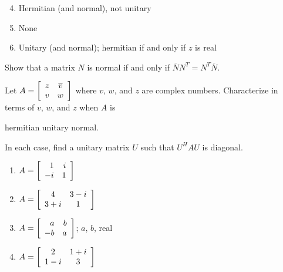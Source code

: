 \begin{multicols}{2}
\begin{ex}
\begin{sol}
\begin{enumerate}[label={\alph*.}]
\setcounter{enumi}{3}
\item  Hermitian (and normal), not unitary

\setcounter{enumi}{5}
\item  None

\setcounter{enumi}{7}
\item  Unitary (and normal); hermitian if and only if $z$ is real

\end{enumerate}
\end{sol}
\end{ex}

\begin{ex}
Show that a matrix $N$ is normal if and only if $\overline{N}N^T = N^T\overline{N}$.
\end{ex}

\begin{ex}
Let $A = \left[ \begin{array}{cc}
z & \overline{v} \\
v & w
\end{array}\right]$
 where $v$, $w$, and $z$ are complex numbers. Characterize in terms of $v$, $w$, and $z$ when $A$ is

\begin{exenumerate}
\exitem hermitian
\exitem unitary
\exitem normal.
\end{exenumerate}
\end{ex}

\begin{ex}
In each case, find a unitary matrix $U$ such that $U^{H}AU$ is diagonal.


\begin{enumerate}[label={\alph*.}]
\item $A = \left[ \begin{array}{rr}
1 & i\\
-i & 1
\end{array}\right]$

\item $A = \left[ \begin{array}{cc}
4 & 3 - i \\
3 + i & 1
\end{array}\right]$

\item $A = \left[ \begin{array}{rr}
a & b\\
-b & a
\end{array}\right]$;  $a$, $b$, real 

\item $A = \left[ \begin{array}{cc}
2 & 1 + i\\
1 - i & 3
\end{array}\right]$


\end{enumerate}
\end{ex}
\end{multicols}
